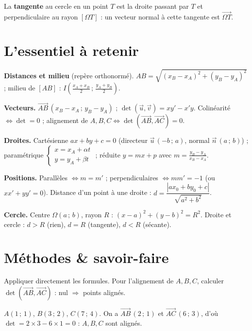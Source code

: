 \begin{remarque}
La \textbf{tangente} au cercle en un point $T$ est la droite passant par $T$ et
perpendiculaire au rayon $[\Omega T]$ : un vecteur normal à cette tangente est
$\overrightarrow{\Omega T}$.
\end{remarque}

\section{L'essentiel à retenir}

\begin{synthese}
\textbf{Distances et milieu} (repère orthonormé). $AB=\sqrt{(x_B-x_A)^2+(y_B-y_A)^2}$ ;
milieu de $[AB]$ : $I\!\left(\tfrac{x_A+x_B}{2}\,;\,\tfrac{y_A+y_B}{2}\right)$.

\smallskip
\textbf{Vecteurs.} $\overrightarrow{AB}\,(x_B-x_A\,;\,y_B-y_A)$ ;
$\det(\vec{u},\vec{v})=xy'-x'y$. Colinéarité $\iff\det=0$ ; alignement de $A,B,C
\iff\det(\overrightarrow{AB},\overrightarrow{AC})=0$.

\smallskip
\textbf{Droites.} Cartésienne $ax+by+c=0$ (directeur $\vec{u}\,(-b\,;\,a)$, normal
$\vec{n}\,(a\,;\,b)$) ; paramétrique $\begin{cases}x=x_A+\alpha t\\ y=y_A+\beta t\end{cases}$ ;
réduite $y=mx+p$ avec $m=\tfrac{y_B-y_A}{x_B-x_A}$.

\smallskip
\textbf{Positions.} Parallèles $\iff m=m'$ ; perpendiculaires $\iff mm'=-1$ (ou
$xx'+yy'=0$). Distance d'un point à une droite :
$d=\dfrac{|ax_0+by_0+c|}{\sqrt{a^2+b^2}}$.

\smallskip
\textbf{Cercle.} Centre $\Omega(a\,;\,b)$, rayon $R$ : $(x-a)^2+(y-b)^2=R^2$.
Droite et cercle : $d>R$ (rien), $d=R$ (tangente), $d<R$ (sécante).
\end{synthese}

\section{Méthodes \& savoir-faire}

Appliquer directement les formules. Pour l'alignement de $A,B,C$, calculer
$\det(\overrightarrow{AB},\overrightarrow{AC})$ : nul $\Rightarrow$ points alignés.
\begin{exemple}
$A(1\,;\,1)$, $B(3\,;\,2)$, $C(7\,;\,4)$. On a $\overrightarrow{AB}\,(2\,;\,1)$ et
$\overrightarrow{AC}\,(6\,;\,3)$, d'où $\det=2\times 3-6\times 1=0$ : $A,B,C$ sont
alignés.
\end{exemple}

